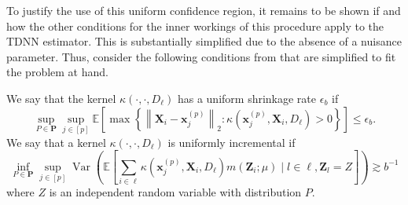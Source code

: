 \documentclass[letterpaper,10pt]{article}
\numberwithin{equation}{section}
\numberwithin{theorem}{section}
\theoremstyle{definition}
\newcommand{\1}{\mathbb{1}}
\begin{document}
To justify the use of this uniform confidence region, it remains to be shown if and how the other conditions for the inner workings of this procedure apply to the TDNN estimator.
This is substantially simplified due to the absence of a nuisance parameter.
Thus, consider the following conditions from \cite{ritzwoller_uniform_2024} that are simplified to fit the problem at hand.

\vspace{0.5cm}
\begin{definition}
	We say that the kernel $\kappa\left(\cdot, \cdot, D_{\ell}\right)$ has a uniform shrinkage rate $\epsilon_b$ if
	\begin{equation}
		\sup_{P \in \mathbf{P}} \sup_{j \in[p]}
		\mathbb{E}\left[\max \left\{\left\|\mathbf{X}_i-\mathbf{x}^{(p)}_{j}\right\|_{2}: \kappa\left(\mathbf{x}^{(p)}_{j}, \mathbf{X}_i, D_{\ell}\right)>0\right\}\right]
		\leq \epsilon_b .
	\end{equation}
	We say that a kernel $\kappa\left(\cdot, \cdot, D_{\ell}\right)$ is uniformly incremental if
	\begin{equation}
		\inf_{P \in \mathbf{P}} \sup_{j \in[p]}
		\operatorname{Var}\left(\mathbb{E}\left[\sum_{i \in \ell} \kappa\left(\mathbf{x}^{(p)}_{j}, \mathbf{X}_i, D_{\ell}\right) m\left(\mathbf{Z}_i ; \mu\right) \mid l \in \ell, \mathbf{Z}_l = Z\right]\right)
		\gtrsim b^{-1}
	\end{equation}
	where $Z$ is an independent random variable with distribution $P$.
\end{definition}
\end{document}
